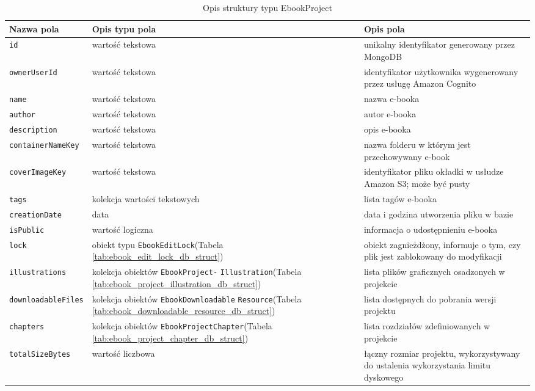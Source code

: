 \begin{table}
    \caption{Opis struktury typu EbookProject}
    \renewcommand{\arraystretch}{1.3} %
    \centering
    \begin{tabular}{|>{\centering\arraybackslash}m{4.7cm}|>{\centering\arraybackslash}m{4.7cm}|>{\centering\arraybackslash}m{4.7cm}|} \hline
        \textbf{Nazwa pola} & \textbf{Opis typu pola} & \textbf{Opis pola} \\ \hline
        \verb|id| & wartość tekstowa & unikalny identyfikator generowany przez MongoDB \\ \hline
        \verb|ownerUserId| & wartość tekstowa & identyfikator użytkownika wygenerowany przez usługę Amazon Cognito \\ \hline
        \verb|name| & wartość tekstowa & nazwa e-booka  \\ \hline
        \verb|author| & wartość tekstowa & autor e-booka \\ \hline
        \verb|description| & wartość tekstowa & opis e-booka \\ \hline
        \verb|containerNameKey| & wartość tekstowa & nazwa folderu w którym jest przechowywany e-book \\ \hline
        \verb|coverImageKey| & wartość tekstowa & identyfikator pliku okładki w usłudze Amazon S3; może być pusty \\ \hline
        \verb|tags| & kolekcja wartości tekstowych & lista tagów e-booka \\ \hline
        \verb|creationDate| & data & data i godzina utworzenia pliku w bazie \\ \hline
        \verb|isPublic| & wartość logiczna & informacja o udostępnieniu e-booka \\ \hline
        \verb|lock| & obiekt typu \verb|EbookEditLock|\newline(Tabela \ref{tab:ebook_edit_lock_db_struct}) & obiekt zagnieżdżony, informuje o tym, czy plik jest zablokowany do modyfikacji \\ \hline
        \verb|illustrations| & kolekcja obiektów \verb|EbookProject-| \verb|Illustration|\newline(Tabela \ref{tab:ebook_project_illustration_db_struct}) & lista plików graficznych osadzonych w projekcie \\ \hline
        \verb|downloadableFiles| & kolekcja obiektów \verb|EbookDownloadable| \verb|Resource|\newline(Tabela \ref{tab:ebook_downloadable_resource_db_struct}) & lista dostępnych do pobrania wersji projektu \\ \hline
        \verb|chapters| & kolekcja obiektów \verb|EbookProjectChapter|\newline(Tabela \ref{tab:ebook_project_chapter_db_struct}) & lista rozdziałów zdefiniowanych w projekcie \\ \hline
        \verb|totalSizeBytes| & wartość liczbowa & łączny rozmiar projektu, wykorzystywany do ustalenia wykorzystania limitu dyskowego \\ \hline
    \end{tabular}
    \label{tab:ebook_project_db_struct}
\end{table}

